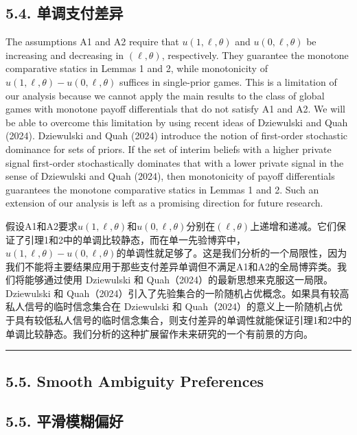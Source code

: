 \documentclass[12pt,a4paper]{article}
\newenvironment{original}
  {\par\medskip\noindent\color{black}\ignorespaces}
  {\par\medskip}
\newenvironment{translation}
  {\par\noindent\color{darkblue}\ignorespaces}
  {\par\medskip\noindent\hrule\par\medskip}
\theoremstyle{definition}
\theoremstyle{remark}
\begin{document}
\subsection*{\color{darkblue}5.4. 单调支付差异}

\begin{original}
The assumptions A1 and A2 require that $u(1, \ell, \theta)$ and $u(0, \ell, \theta)$ be increasing and decreasing in $(\ell, \theta)$, respectively. They guarantee the monotone comparative statics in Lemmas 1 and 2, while monotonicity of $u(1, \ell, \theta) - u(0, \ell, \theta)$ suffices in single-prior games. This is a limitation of our analysis because we cannot apply the main results to the class of global games with monotone payoff differentials that do not satisfy A1 and A2. We will be able to overcome this limitation by using recent ideas of Dziewulski and Quah (2024). Dziewulski and Quah (2024) introduce the notion of first-order stochastic dominance for sets of priors. If the set of interim beliefs with a higher private signal first-order stochastically dominates that with a lower private signal in the sense of Dziewulski and Quah (2024), then monotonicity of payoff differentials guarantees the monotone comparative statics in Lemmas 1 and 2. Such an extension of our analysis is left as a promising direction for future research.
\end{original}
\begin{translation}
假设A1和A2要求$u(1, \ell, \theta)$和$u(0, \ell, \theta)$分别在$(\ell, \theta)$上递增和递减。它们保证了引理1和2中的单调比较静态，而在单一先验博弈中，$u(1, \ell, \theta) - u(0, \ell, \theta)$的单调性就足够了。这是我们分析的一个局限性，因为我们不能将主要结果应用于那些支付差异单调但不满足A1和A2的全局博弈类。我们将能够通过使用 Dziewulski 和 Quah（2024）的最新思想来克服这一局限。Dziewulski 和 Quah（2024）引入了先验集合的一阶随机占优概念。如果具有较高私人信号的临时信念集合在 Dziewulski 和 Quah（2024）的意义上一阶随机占优于具有较低私人信号的临时信念集合，则支付差异的单调性就能保证引理1和2中的单调比较静态。我们分析的这种扩展留作未来研究的一个有前景的方向。
\end{translation}

\subsection{5.5. Smooth Ambiguity Preferences}
\subsection*{\color{darkblue}5.5. 平滑模糊偏好}
\end{document}
